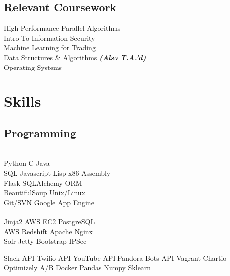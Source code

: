 \documentclass[]{deedy-resume-openfont}
\begin{document}
\begin{minipage}[t]{0.31\textwidth}
\subsection{Relevant Coursework}
High Performance Parallel Algorithms \\
Intro To Information Security \\
Machine Learning for Trading \\
Data Structures \& Algorithms {\footnotesize \textit{\textbf{(Also T.A.'d) }}} \\
Operating Systems
\\[1\baselineskip]


\section{Skills}
\subsection{Programming}
\\[1\baselineskip]

Python \textbullet{}     C     \textbullet{} Java  
\\[1\baselineskip]

SQL \textbullet{} Javascript \textbullet{} Lisp \textbullet{} x86 Assembly
\\[1\baselineskip]

Flask \textbullet{} SQLAlchemy ORM \\
\textbullet{} BeautifulSoup \textbullet{} Unix/Linux \\ 
Git/SVN \textbullet{} Google App Engine \\
\\[1\baselineskip]
Jinja2  \textbullet{} AWS EC2 \textbullet{} PostgreSQL \\
AWS Redshift \textbullet{} Apache \textbullet{} Nginx\\ 
Solr \textbullet{} Jetty \textbullet{} Bootstrap \textbullet{} IPSec
\sectionsep

  Slack API \textbullet{} Twilio API \textbullet{} YouTube API 
  Pandora Bots API \textbullet{}  Vagrant \textbullet{} Chartio 
  Optimizely A/B \textbullet{} Docker \textbullet{} Pandas 
  Numpy \textbullet{} Sklearn
\sectionsep
\\[1\baselineskip]


\end{minipage}
\end{document}

